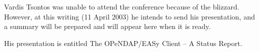 Vardis Tsontos was unable to attend the conference because of the
blizzard.  However, at this writing (11 April 2003) he intends to
send his presentation, and a summary will be prepared and will
appear here when it is ready.

His presentation is entitled The \ac{OPeNDAP}/\ac{EASy} Client -- A Status
Report.

%
%
%
%

